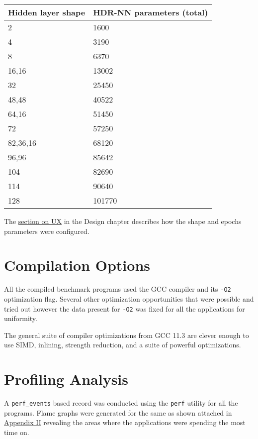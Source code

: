\begin{table}[ht]
	\centering
	\begin{tabular}{ |p{11em}|p{14em}| }
		\hline
			\textbf{Hidden layer shape} & \textbf{HDR-NN parameters} (total)\\
		\hline
			2 & 1600 \\
		\hline
			4 & 3190 \\
		\hline
			8 & 6370 \\
		\hline
			16,16 & 13002 \\
		\hline
			32 & 25450 \\
		\hline
			48,48 & 40522 \\
		\hline
			64,16 & 51450 \\
		\hline
			72 & 57250 \\
		\hline
			82,36,16 & 68120 \\
		\hline
			96,96 & 85642 \\
		\hline
			104 & 82690 \\
		\hline
			114 & 90640 \\
		\hline
			128 & 101770 \\
		\hline
	\end{tabular}
\end{table}

The \hyperref[section:hdrnn-ux]{section on UX} in the Design chapter describes how the shape and epochs parameters were configured.

\section{Compilation Options}

All the compiled benchmark programs used the GCC compiler and its \texttt{-O2} optimization flag. Several other optimization opportunities that were possible and tried out however the data present for \texttt{-O2} was fixed for all the applications for uniformity.

The general suite of compiler optimizations from GCC 11.3 are clever enough to use SIMD, inlining, strength reduction, and a suite of powerful optimizations.

\section{Profiling Analysis}

A \texttt{perf\_events} based record was conducted using the \texttt{perf} utility for all the programs. Flame graphs were generated for the same as shown attached in \hyperref[hdrnn-profile]{Appendix II} revealing the areas where the applications were spending the most time on.

